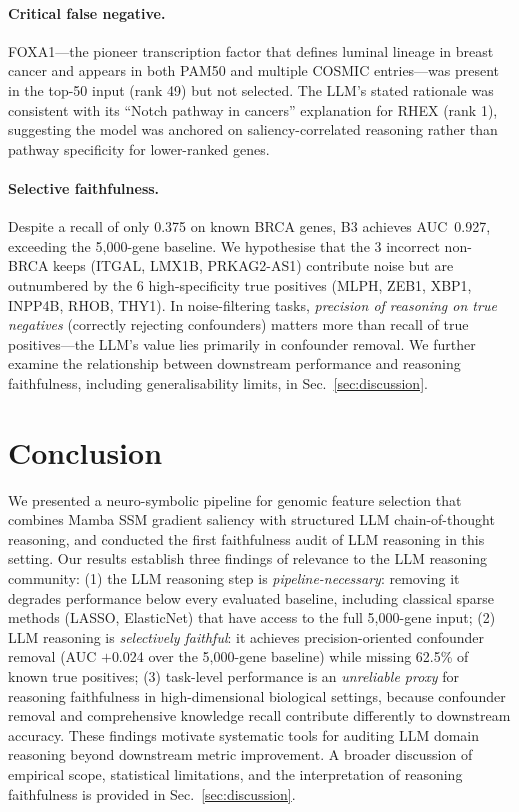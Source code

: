 \documentclass{article}
\begin{document}
\paragraph{Critical false negative.}
FOXA1---the pioneer transcription factor that defines luminal lineage in
breast cancer and appears in both PAM50 and multiple COSMIC entries---was
present in the top-50 input (rank 49) but not selected.
The LLM's stated rationale was consistent with its ``Notch pathway in
cancers'' explanation for RHEX (rank 1), suggesting the model was anchored
on saliency-correlated reasoning rather than pathway specificity for
lower-ranked genes.

\paragraph{Selective faithfulness.}
Despite a recall of only 0.375 on known BRCA genes, B3 achieves
AUC~0.927, exceeding the 5,000-gene baseline.
We hypothesise that the 3 incorrect non-BRCA keeps (ITGAL, LMX1B,
PRKAG2-AS1) contribute noise but are outnumbered by the 6 high-specificity
true positives (MLPH, ZEB1, XBP1, INPP4B, RHOB, THY1).
In noise-filtering tasks, \emph{precision of reasoning on true negatives}
(correctly rejecting confounders) matters more than recall of true
positives---the LLM's value lies primarily in confounder removal.
We further examine the relationship between downstream performance and
reasoning faithfulness, including generalisability limits, in
Sec.~\ref{sec:discussion}.

\section{Conclusion}
\label{sec:conclusion}

We presented a neuro-symbolic pipeline for genomic feature selection that
combines Mamba SSM gradient saliency with structured LLM chain-of-thought
reasoning, and conducted the first faithfulness audit of LLM reasoning in
this setting.
Our results establish three findings of relevance to the LLM reasoning
community:
(1) the LLM reasoning step is \emph{pipeline-necessary}: removing it
degrades performance below every evaluated baseline, including classical
sparse methods (LASSO, ElasticNet) that have access to the full
5,000-gene input;
(2) LLM reasoning is \emph{selectively faithful}: it achieves
precision-oriented confounder removal (AUC $+$0.024 over the 5,000-gene
baseline) while missing 62.5\% of known true positives;
(3) task-level performance is an \emph{unreliable proxy} for reasoning
faithfulness in high-dimensional biological settings, because confounder
removal and comprehensive knowledge recall contribute differently to
downstream accuracy.
These findings motivate systematic tools for auditing LLM domain reasoning
beyond downstream metric improvement.
A broader discussion of empirical scope, statistical limitations, and the
interpretation of reasoning faithfulness is provided in
Sec.~\ref{sec:discussion}.
\end{document}
